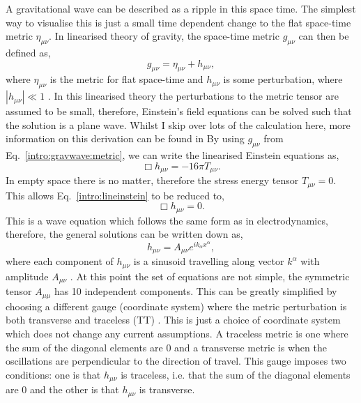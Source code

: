 A gravitational wave can be described as a ripple in this space time.
The simplest way to visualise this is just a small time dependent change to the flat space-time metric $\eta_{\mu\nu}$.
In linearised theory of gravity, the space-time metric $g_{\mu \nu}$ can then be defined as,
\begin{equation}
\label{intro:gravwave:metric}
    g_{\mu \nu} = \eta_{\mu \nu} + h_{\mu \nu},
\end{equation}
where $ \eta_{\mu \nu}$ is the metric for flat space-time and $h_{\mu \nu}$ is some perturbation, where $|h_{\mu \nu}| \ll 1$ \citep{flanagan2005BasicsGravitational}. 
In this linearised theory the perturbations to the metric tensor are assumed to be small, therefore, Einstein's field equations can be solved such that the solution is a plane wave. 
Whilst I skip over lots of the calculation here, more information on this derivation can be found in \citep{flanagan2005BasicsGravitational,}
By using $g_{\mu \nu}$ from Eq.~\ref{intro:gravwave:metric}, we can write the linearised Einstein equations as,
\begin{equation}
\label{intro:lineinstein}
    \Box h_{\mu \nu} = -16 \pi T_{\mu\nu}.
\end{equation}
In empty space there is no matter, therefore the stress energy tensor $T_{\mu \nu} = 0$.
This allows Eq.~\ref{intro:lineinstein} to be reduced to, 
\begin{equation}
    \Box h_{\mu \nu} = 0.
\end{equation}
This is a wave equation which follows the same form as in electrodynamics, therefore, the general solutions can be written down as,
\begin{equation}
    h_{\mu\nu} = A_{\mu\nu}e^{ik_{\alpha} x^{\alpha}},
\end{equation}
where each component of $h_{\mu \nu}$ is a sinusoid travelling along vector $k^{\alpha}$ with amplitude $A_{\mu\nu}$ \citep{capano2011SearchingGravitational}.
At this point the set of equations are not simple, the symmetric tensor $A_{\mu \mu}$ has 10 independent components.
This can be greatly simplified by choosing a different gauge (coordinate system) where the metric perturbation is both transverse and traceless (TT) \citep{flanagan2005BasicsGravitational}.
This is just a choice of coordinate system which does not change any current assumptions. A traceless metric is one where the sum of the diagonal elements are 0 and a transverse metric is when the oscillations are perpendicular to the direction of travel. 
This gauge imposes two conditions: one is that $h_{\mu \nu}$ is traceless, i.e. that the sum of the diagonal elements are 0 and the other is that $h_{\mu \nu}$ is transverse. 
